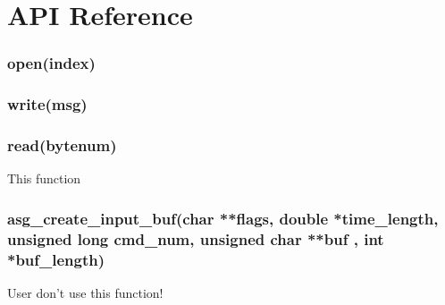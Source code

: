 \chapter{API Reference}

%

\subsection{open(index)}
\subsection{write(msg)}
\subsection{read(bytenum)}
This function  
\subsection{asg\_create\_input\_buf(char **flags, double *time\_length, unsigned long cmd\_num,
 \newline unsigned char **buf , int *buf\_length)}
User don't use this function!
